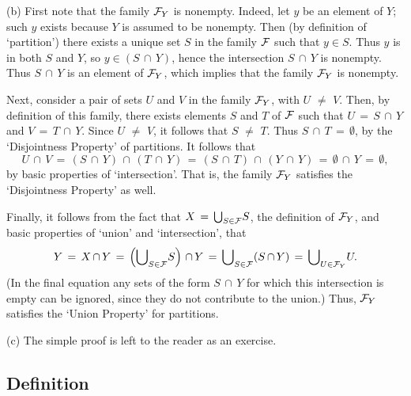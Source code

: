{\V

        (b) First note that the family ${\cal F}_{Y}$ is nonempty.
    Indeed, let $y$ be an element of $Y$; such $y$ exists because $Y$ is assumed to be nonempty.
    Then (by definition of `partition') there exists a unique set $S$ in the family ${\cal F}$ such that $y{\in}S$.
    Thus $y$ is in both $S$ and $Y$, so $y{\in}(S\,{\cap}\,Y)$, hence the intersection $S\,{\cap}\,Y$ is nonempty.
    Thus $S\,{\cap}\,Y$ is an element of ${\cal F}_{Y}$, which implies that the family ${\cal F}_{Y}$ is nonempty.

        Next, consider a pair of sets $U$ and $V$ in the family ${\cal F}_{Y}$, with $U \,\,{\neq}\,\, V$.
    Then, by definition of this family, there exists elements $S$ and $T$ of ${\cal F}$ such that $U \,=\, S\,{\cap}\,Y$ and $V \,=\, T\,{\cap}\,Y$.
    Since $U\,\,{\neq}\,\, V$, it follows that $S \,\,{\neq}\,\, T$.
    Thus $S\,{\cap}\,T \,=\, {\emptyset}$, by the `Disjointness Property' of partitions.
    It follows that
        \begin{displaymath}
        U\,{\cap}\,V \,=\, (S\,{\cap}\,Y)\,{\cap}\,(T\,{\cap}\,Y) \,=\, (S\,{\cap}\,T)\,{\cap}\,(Y\,{\cap}\,Y) \,=\, {\emptyset}\,{\cap}\,Y \,=\, {\emptyset},
        \end{displaymath}
    by basic properties of `intersection'.
    That is, the family ${\cal F}_{Y}$ satisfies the `Disjointness Property' as well.

        Finally, it follows from the fact that $X \,=\, {\bigcup}_{S{\in}{\cal F}} S$, the definition of ${\cal F}_{Y}$,
    and basic properties of `union' and `intersection', that
        \begin{displaymath}
        Y \,=\, X\,{\cap}\,Y \,=\, \left({\bigcup}_{S{\in}{\cal F}} S\right)\,{\cap}\,Y \,=\, {\bigcup}_{S{\in}{\cal F}} (S\,{\cap}\,Y) \,=\, 
    {\bigcup}_{U{\in}{\cal F}_{Y}} U.
        \end{displaymath}
    (In the final equation any sets of the form $S\,{\cap}\,Y$ for which this intersection is empty can be ignored, since they do not contribute to the union.)
    Thus, ${\cal F}_{Y}$ satisfies the `Union Property' for partitions.

\V

        (c) The simple proof is left to the reader as an exercise.


\V
\V

        \subsection{\small{{\bf Definition}}}
                \label{DefA50.117}

}
